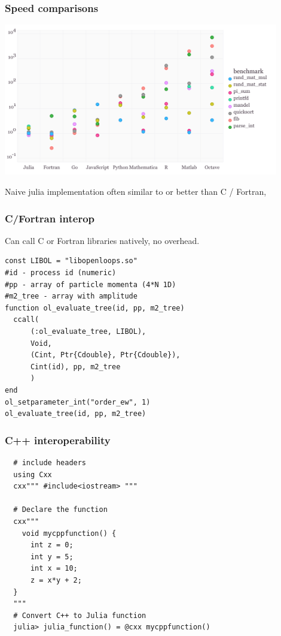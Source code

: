 \documentclass[16pt]{beamer}
\begin{document}
\begin{frame}
  \frametitle{Speed comparisons}
  \begin{centering}
  \includegraphics[width=12cm]{speedcomp.png}
  \end{centering}
  Naive julia implementation often similar to or better than C / Fortran, 
\end{frame}

\begin{frame}[fragile]
  \frametitle{C/Fortran interop}
  Can call C or Fortran libraries natively, no overhead.

  \begin{lstlisting}
const LIBOL = "libopenloops.so"
#id - process id (numeric)
#pp - array of particle momenta (4*N 1D)
#m2_tree - array with amplitude
function ol_evaluate_tree(id, pp, m2_tree)
  ccall(
      (:ol_evaluate_tree, LIBOL),
      Void,
      (Cint, Ptr{Cdouble}, Ptr{Cdouble}),
      Cint(id), pp, m2_tree
      )
end
ol_setparameter_int("order_ew", 1)
ol_evaluate_tree(id, pp, m2_tree)
  \end{lstlisting}
\end{frame}

\begin{frame}[fragile]
  \frametitle{C++ interoperability}
  \begin{lstlisting}
  # include headers
  using Cxx
  cxx""" #include<iostream> """  

  # Declare the function
  cxx"""
    void mycppfunction() {   
      int z = 0;
      int y = 5;
      int x = 10;
      z = x*y + 2;
  }
  """
  # Convert C++ to Julia function
  julia> julia_function() = @cxx mycppfunction()
  \end{lstlisting}

\end{frame}
\end{document}
